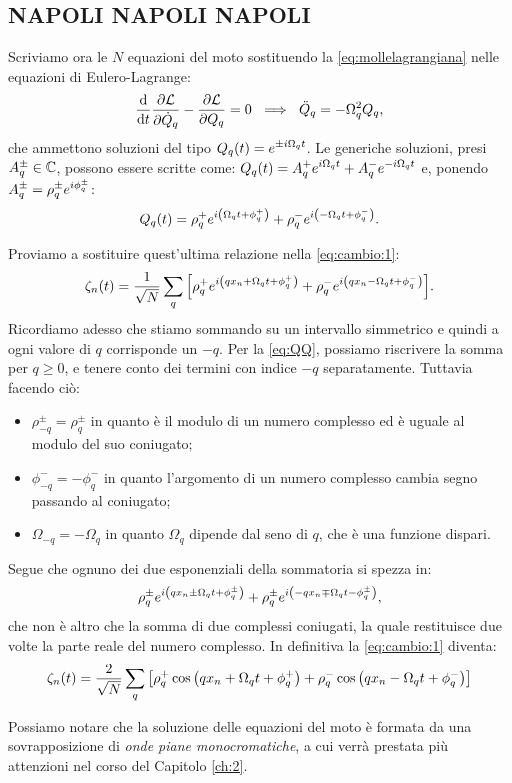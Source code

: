                 \subsection{NAPOLI NAPOLI NAPOLI}
                    Scriviamo ora le $N$ equazioni del moto sostituendo la \eqref{eq:mollelagrangiana} nelle equazioni di Eulero-Lagrange:
                        $$\lagrange{\LL}{Q_q}{\dot{Q}_q}=0\ \implies\ \ddot{Q}_q=-\Omega_q^2Q_q,$$
                    che ammettono soluzioni del tipo $\displaystyle Q_q\qty(t)=e^{\pm i\Omega_qt}$. Le generiche soluzioni, presi $A_q^\pm\in\mathbb{C}$, possono essere scritte come: $\displaystyle Q_q\qty(t)=A_q^+e^{i\Omega_qt}+A_q^-e^{-i\Omega_qt}$ e, ponendo $\displaystyle A_q^\pm=\rho_q^\pm e^{i\phi_q^\pm}$:
                        $$Q_q\qty(t)=\rho_q^+e^{i\qty(\Omega_qt+\phi_q^+)}+\rho_q^-e^{i\qty(-\Omega_qt+\phi_q^-)}.$$
                    \par Proviamo a sostituire quest'ultima relazione nella \eqref{eq:cambio:1}:
                        $$\zeta_n\qty(t)=\frac{1}{\sqrt{N}}\sum_q\qty[\rho_q^+e^{i\qty(qx_n+\Omega_qt+\phi_q^+)}+\rho_q^-e^{i\qty(qx_n-\Omega_qt+\phi_q^-)}].$$
                    Ricordiamo adesso che stiamo sommando su un intervallo simmetrico e quindi a ogni valore di $q$ corrisponde un $-q$. Per la \eqref{eq:QQ}, possiamo riscrivere la somma per $q\geq 0$, e tenere conto dei termini con indice $-q$ separatamente. Tuttavia facendo ci\`o: 
                    \begin{itemize}
                        \item $\rho_{-q}^\pm=\rho_{q}^\pm$ in quanto \`e il modulo di un numero complesso ed \`e uguale al modulo del suo coniugato;
                        \item $\phi_{-q}^-=-\phi_q^-$ in quanto l'argomento di un numero complesso cambia segno passando al coniugato;
                        \item $\Omega_{-q}=-\Omega_q$ in quanto $\Omega_q$ dipende dal seno di $q$, che \`e una funzione dispari.
                    \end{itemize}
                    Segue che ognuno dei due esponenziali della sommatoria si spezza in:
                        $$\rho_q^\pm e^{i\qty(qx_n\pm\Omega_qt+\phi_q^\pm)}+\rho_{q}^\pm e^{i\qty(-qx_n\mp\Omega_qt-\phi_{q}^\pm)},$$
                    che non \`e altro che la somma di due complessi coniugati, la quale restituisce due volte la parte reale del numero complesso. In definitiva la \eqref{eq:cambio:1} diventa:
                    \begin{equation}
                        \zeta_n\qty(t)=\frac{2}{\sqrt{N}}\sum_q\qty[\rho_q^+\cos\qty(qx_n+\Omega_qt+\phi_q^+)+\rho_q^-\cos\qty(qx_n-\Omega_qt+\phi_q^-)]
                    \end{equation}
                    \par Possiamo notare che la soluzione delle equazioni del moto \`e formata da una sovrapposizione di \emph{onde piane monocromatiche}, a cui verr\`a prestata pi\`u attenzioni nel corso del Capitolo \ref{ch:2}.
